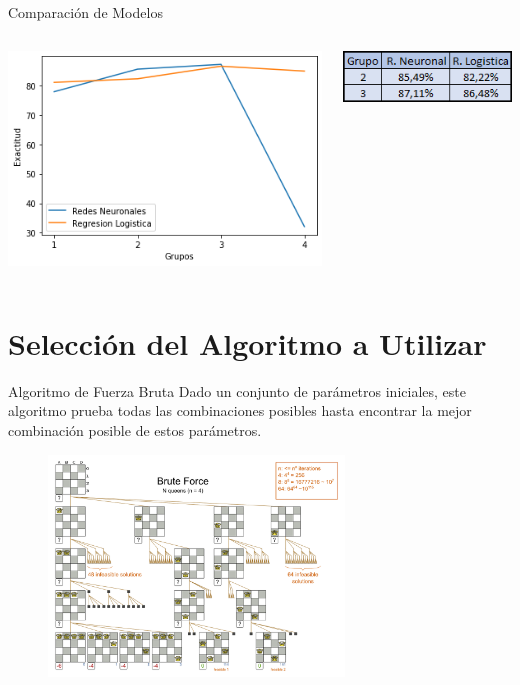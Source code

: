 \documentclass{beamer}
\begin{document}
\begin{frame}{Comparación de Modelos}
    \begin{columns}
    \includegraphics[width=\columnwidth]{Imagenes/Comparacion.png}
    
    \includegraphics[width=\columnwidth]{Imagenes/Comparacion_2.png}
    
    \end{columns}
\end{frame}

\section{Selección del Algoritmo a Utilizar}

\begin{frame}{Algoritmo de Fuerza Bruta}
    Dado un conjunto de parámetros iniciales, este algoritmo prueba todas las combinaciones posibles hasta encontrar la mejor combinación posible de estos parámetros.
    \begin{figure}
        \centering
        \includegraphics[width=0.7\textwidth]{Imagenes/n_reinas.png}
    \end{figure}
\end{frame}
\end{document}
